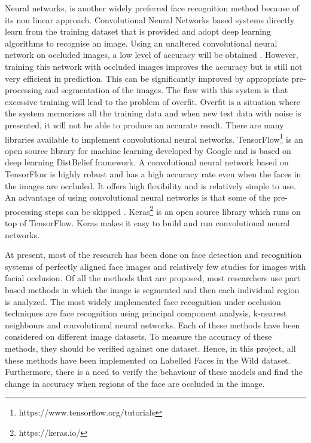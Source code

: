 \documentclass[conference]{IEEEtran}
\begin{document}
Neural networks, is another widely preferred face recognition method because of its non linear approach. Convolutional Neural Networks based systems directly learn from the training dataset that is provided and adopt deep learning algorithms to recognise an image. Using an unaltered convolutional neural network on occluded images, a low level of accuracy will be obtained \cite{chandler2016mitigation}. However, training this network with occluded images improves the accuracy but is still not very efficient in prediction. This can be significantly improved by appropriate pre-processing and segmentation of the images. The flaw with this system is that excessive training will lead to the problem of overfit. Overfit is a situation where the system memorizes all the training data and when new test data with noise is presented, it will not be able to produce an accurate result. There are many libraries available to implement convolutional neural networks\cite{2016arXiv160502688short}\cite{Jia:2014:CCA:2647868.2654889}. TensorFlow\footnote{https://www.tensorflow.org/tutorials} is an open source library for machine learning developed by Google and is based on deep learning DistBelief framework. A convolutional neural network based on TensorFlow is highly robust and has a high accuracy rate even when the faces in the images are occluded.  It offers high flexibility and is relatively simple to use. An advantage of using convolutional neural networks is that some of the pre-processing steps can be skipped \cite{oliveira2017irish}. Keras\footnote{https://keras.io/} is an open source library which runs on top of TensorFlow. Keras makes it easy to build and run convolutional neural networks\cite{chollet2015keras}.

At present, most of the research has been done on face detection and recognition systems of perfectly aligned face images and relatively few studies for images with facial occlusion. Of all the methods that are proposed, most researchers use part based methods in which the image is segmented and then each individual region is analyzed. The most widely implemented face recognition under occlusion techniques are face recognition using principal component analysis, k-nearest neighbours and convolutional neural networks. Each of these methods have been considered on different image datasets. To measure the accuracy of these methods, they should be verified against one dataset. Hence, in this project, all these methods have been implemented on Labelled Faces in the Wild dataset. Furthermore, there is a need to verify the behaviour of these models and find the change in accuracy when regions of the face are occluded in the image.
\end{document}
